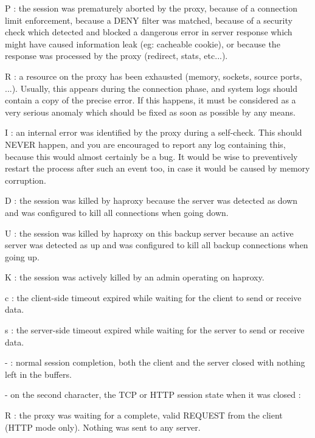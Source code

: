         P : the session was prematurely aborted by the proxy, because of a
            connection limit enforcement, because a DENY filter was matched,
            because of a security check which detected and blocked a dangerous
            error in server response which might have caused information leak
            (eg: cacheable cookie), or because the response was processed by
            the proxy (redirect, stats, etc...).

        R : a resource on the proxy has been exhausted (memory, sockets, source
            ports, ...). Usually, this appears during the connection phase, and
            system logs should contain a copy of the precise error. If this
            happens, it must be considered as a very serious anomaly which
            should be fixed as soon as possible by any means.

        I : an internal error was identified by the proxy during a self-check.
            This should NEVER happen, and you are encouraged to report any log
            containing this, because this would almost certainly be a bug. It
            would be wise to preventively restart the process after such an
            event too, in case it would be caused by memory corruption.

        D : the session was killed by haproxy because the server was detected
            as down and was configured to kill all connections when going down.

        U : the session was killed by haproxy on this backup server because an
            active server was detected as up and was configured to kill all
            backup connections when going up.

        K : the session was actively killed by an admin operating on haproxy.

        c : the client-side timeout expired while waiting for the client to
            send or receive data.

        s : the server-side timeout expired while waiting for the server to
            send or receive data.

        - : normal session completion, both the client and the server closed
            with nothing left in the buffers.

  - on the second character, the TCP or HTTP session state when it was closed :

        R : the proxy was waiting for a complete, valid REQUEST from the client
            (HTTP mode only). Nothing was sent to any server.

